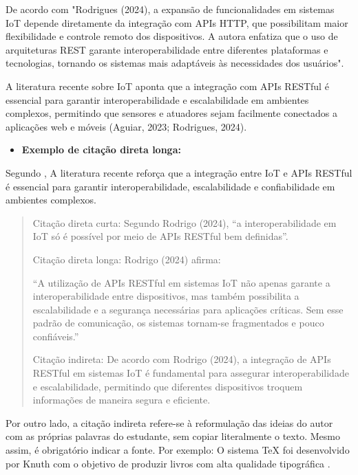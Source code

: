\documentclass[12pt]{unisenaiclass}
\begin{document}
De acordo com "Rodrigues (2024), a expansão de funcionalidades em sistemas IoT depende diretamente da integração com APIs HTTP, que possibilitam maior flexibilidade e controle remoto dos dispositivos. A autora enfatiza que o uso de arquiteturas REST garante interoperabilidade entre diferentes plataformas e tecnologias, tornando os sistemas mais adaptáveis às necessidades dos usuários".

A literatura recente sobre IoT aponta que a integração com APIs RESTful é essencial para garantir interoperabilidade e escalabilidade em ambientes complexos, permitindo que sensores e atuadores sejam facilmente conectados a aplicações web e móveis (Aguiar, 2023; Rodrigues, 2024).

\begin{itemize}
    \item \textbf{Exemplo de citação direta longa:}
\end{itemize}

Segundo \textcite{Segundo Rodrigo (2024)}, A literatura recente reforça que a integração entre IoT e APIs RESTful é essencial para garantir interoperabilidade, escalabilidade e confiabilidade em ambientes complexos.

\begin{quote}
Citação direta curta:  
Segundo Rodrigo (2024), “a interoperabilidade em IoT só é possível por meio de APIs RESTful bem definidas”.

Citação direta longa:  
Rodrigo (2024) afirma:

“A utilização de APIs RESTful em sistemas IoT não apenas garante a interoperabilidade entre dispositivos, mas também possibilita a escalabilidade e a segurança necessárias para aplicações críticas. Sem esse padrão de comunicação, os sistemas tornam-se fragmentados e pouco confiáveis.”

Citação indireta:  
De acordo com Rodrigo (2024), a integração de APIs RESTful em sistemas IoT é fundamental para assegurar interoperabilidade e escalabilidade, permitindo que diferentes dispositivos troquem informações de maneira segura e eficiente.
   
\end{quote}

Por outro lado, a citação indireta refere-se à reformulação das ideias do autor com as próprias palavras do estudante, sem copiar literalmente o texto. Mesmo assim, é obrigatório indicar a fonte. Por exemplo: O sistema TeX foi desenvolvido por Knuth com o objetivo de produzir livros com alta qualidade tipográfica \cite{knuth1984tex}.
\end{document}
